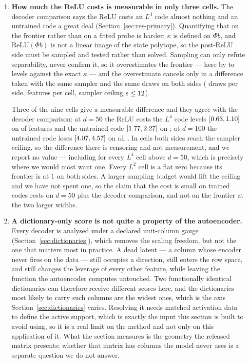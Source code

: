 \begin{enumerate}[leftmargin=*,itemsep=1pt]
\item \textbf{How much the ReLU costs is measurable in only three cells.} The decoder comparison
says the ReLU costs an $L^4$ code almost nothing and an untrained code a great deal
(Section~\ref{sec:res-primary}). Quantifying that on the frontier rather than on a fitted probe is
harder: $\kappa$ is defined on $\Phi b$, and $\mathrm{ReLU}(\Phi b)$ is not a linear image of the
state polytope, so the post-ReLU side must be sampled and tested rather than solved. Sampling can
only refute separability, never confirm it, so it overestimates the frontier --- here by
\ReluLooseMin{} to \ReluLooseMax{} levels against the exact $\kappa$ --- and the overestimate cancels
only in a difference taken with the same sampler and the same draws on both sides
(\ReluGapDraws{} draws per side, \ReluGapFeatures{} features per cell, sampler ceiling
$s\le12$).

Three of the nine cells give a measurable difference and they agree with the decoder comparison: at
$d=50$ the ReLU costs the $L^4$ code \ReluLfourFiftyGap{} levels
$[0.63,1.10]$ on \ReluLfourFiftyPositive{} of \ReluGapFeatures{}
features and the untrained code \ReluRandFiftyGap{} $[1.77,2.27]$ on
\ReluRandFiftyPositive{}; at $d=100$ the untrained code loses \ReluRandHundredGap{}
$[4.07,4.57]$ on all \ReluRandHundredPositive{}. In
\ReluCensoredCells{} cells both sides reach the sampler ceiling, so the difference there is censoring
and not measurement, and we report no value --- including for every $L^4$ cell above $d=50$, which is
precisely where we would most want one. Every $L^2$ cell is a flat zero because its frontier is at
$1$ on both sides. A larger sampling budget would lift the ceiling and we have not spent one, so the
claim that the cost is small on trained codes rests on $d=50$ plus the decoder comparison, and not on
the frontier at the two larger widths.

\item \textbf{A dictionary-only score is not quite a property of the autoencoder.} Every decoder is
analysed under a declared unit-column gauge (Section~\ref{sec:dictionaries}), which removes the
scaling freedom, but not the one that matters most in practice. A dead latent --- a column whose
encoder never fires on the data --- still occupies a direction, still enters the row space, and still
changes the leverage of every other feature, while leaving the function the autoencoder computes
untouched. Two functionally identical dictionaries can therefore receive different scores here, and
the dictionaries most likely to carry such columns are the widest ones, which is the axis
Section~\ref{sec:dictionaries} varies. Resolving it needs matched activation data to define the
active support, which is exactly the input this section is built to avoid using, so it is a real
limit on the method and not only on this application of it. What the section measures is the geometry
the released matrix presents; whether that matrix has columns the model never uses is a separate
question we do not answer.


\end{enumerate}
